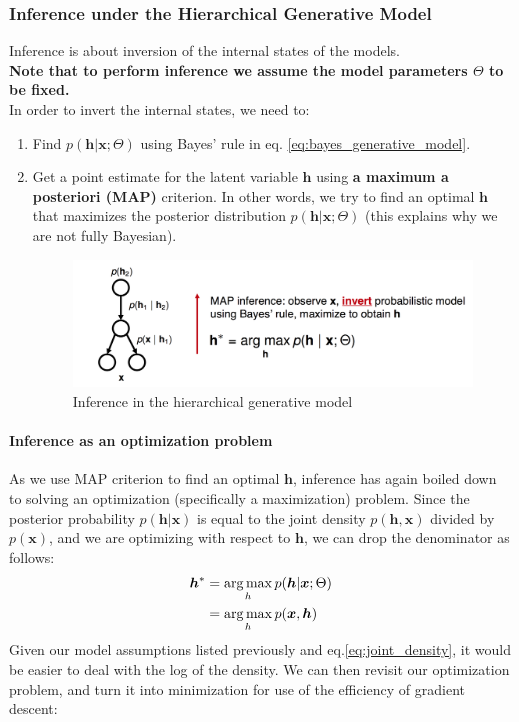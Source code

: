\documentclass[main]{subfiles}
\begin{document}
\subsubsection{Inference under the Hierarchical Generative Model}
Inference is about inversion of the internal states of the models.\\

\noindent
\textbf{Note that to perform inference we assume the model parameters $\Theta$ to be fixed.}\\

\noindent
In order to invert the internal states, we need to:
\begin{enumerate}
    \item Find $p(\bm{h}|\bm{x};\Theta)$ using Bayes' rule in eq. \ref{eq:bayes_generative_model}.
    \item Get a point estimate for the latent variable $\bm{h}$ using \textbf{a maximum a posteriori (MAP)} criterion. In other words, we try to find an optimal $\bm{h}$ that maximizes the posterior distribution $p(\bm{h}|\bm{x};\Theta)$ (this explains why we are not fully Bayesian).
        \begin{figure}[H]
            	\centering
            	\includegraphics[width=0.9\linewidth]{06_PredictionErrorsDuringPerceptionAndLearning/figures/hierarchical_MAP.png}
            	\caption{Inference in the hierarchical generative model} 
            	\label{fig:HGM_inference}
        \end{figure}
            
\end{enumerate}

\paragraph{Inference as an optimization problem}
As we use MAP criterion to find an optimal $\bm{h}$, inference has again boiled down to solving an optimization (specifically a maximization) problem. Since the posterior probability $p(\bm{h}|\bm{x})$ is equal to the joint density $p(\bm{h},\bm{x})$ divided by $p(\bm{x})$, and we are optimizing with respect to $\bm{h}$, we can drop the denominator as follows:
\begin{equation}
    \begin{split}
        \bm{h}^* &= \operatorname*{arg\,max}_h p(\bm{h}|\bm{x};\Theta)\\
        &= \operatorname*{arg\,max}_h p(\bm{x},\bm{h})
    \end{split}
\end{equation}
Given our model assumptions listed previously and  eq.\ref{eq:joint_density}, it would be easier to deal with the log of the density. We can then revisit our optimization problem, and turn it into minimization for use of the efficiency of gradient descent: 
\end{document}
